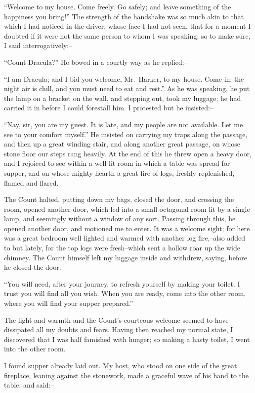 \documentclass[12pt,openright]{book}
\begin{document}
“Welcome to my house. Come freely. Go safely; and leave something of the happiness you bring!” The strength of the handshake was so much akin to that which I had noticed in the driver, whose face I had not seen, that for a moment I doubted if it were not the same person to whom I was speaking; so to make sure, I said interrogatively:–

“Count Dracula?” He bowed in a courtly way as he replied:–

“I am Dracula; and I bid you welcome, Mr. Harker, to my house. Come in; the night air is chill, and you must need to eat and rest.” As he was speaking, he put the lamp on a bracket on the wall, and stepping out, took my luggage; he had carried it in before I could forestall him. I protested but he insisted:–

“Nay, sir, you are my guest. It is late, and my people are not available. Let me see to your comfort myself.” He insisted on carrying my traps along the passage, and then up a great winding stair, and along another great passage, on whose stone floor our steps rang heavily. At the end of this he threw open a heavy door, and I rejoiced to see within a well-lit room in which a table was spread for supper, and on whose mighty hearth a great fire of logs, freshly replenished, flamed and flared.

The Count halted, putting down my bags, closed the door, and crossing the room, opened another door, which led into a small octagonal room lit by a single lamp, and seemingly without a window of any sort. Passing through this, he opened another door, and motioned me to enter. It was a welcome sight; for here was a great bedroom well lighted and warmed with another log fire,–also added to but lately, for the top logs were fresh–which sent a hollow roar up the wide chimney. The Count himself left my luggage inside and withdrew, saying, before he closed the door:–

“You will need, after your journey, to refresh yourself by making your toilet. I trust you will find all you wish. When you are ready, come into the other room, where you will find your supper prepared.”

The light and warmth and the Count’s courteous welcome seemed to have dissipated all my doubts and fears. Having then reached my normal state, I discovered that I was half famished with hunger; so making a hasty toilet, I went into the other room.

I found supper already laid out. My host, who stood on one side of the great fireplace, leaning against the stonework, made a graceful wave of his hand to the table, and said:–
\end{document}
